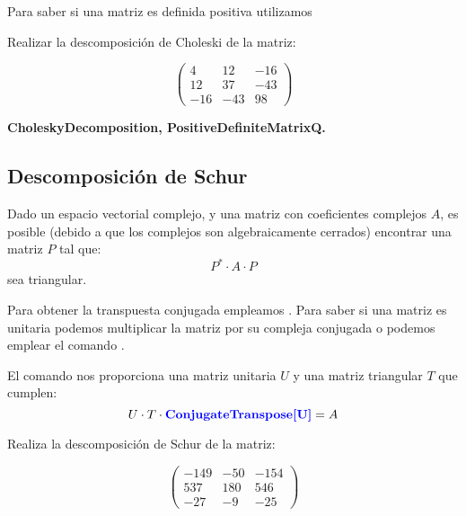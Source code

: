 \documentclass[a4paper,10pt, draft]{article}
\newcommand{\com}[1]{\textbf{\color{blue}{#1}}}
\newenvironment{ejer}{\begin{tcolorbox}[center title, title=Ejercicios,
fonttitle=\sffamily\bfseries,colback=blue!5,colframe=orange]}{\end{tcolorbox}}
\newenvironment{funciones}{\begin{tcolorbox}[center title, title=Nuevas funciones, fonttitle=\sffamily\bfseries, colback=green!5!white,colframe=red!75!black]}{\end{tcolorbox}\bigskip}
\begin{document}
 Para saber si una matriz es definida positiva utilizamos \com{PositiveDefiniteMatrixQ[M]}

\begin{ejer}

Realizar la descomposición de Choleski de la matriz:

$$
\begin{pmatrix}
4 & 12 &-16\\
12& 37&-43\\
-16&-43&98
\end{pmatrix}
$$

\end{ejer} 

\begin{funciones}

\textbf{CholeskyDecomposition, PositiveDefiniteMatrixQ.}

\end{funciones}




 \newpage


\subsection{Descomposición de Schur}


Dado un espacio vectorial complejo, y una matriz con coeficientes complejos $A$, es posible (debido a que  los complejos  son algebraicamente cerrados) encontrar una matriz $P$ tal que:
$$
P^*\cdot A\cdot P
$$
sea triangular.



Para obtener la transpuesta conjugada empleamos \com{ConjugateTranspose[M]}. Para saber si una matriz es unitaria podemos multiplicar la matriz por su compleja conjugada o podemos emplear el comando \com{UnitaryMatrixQ[M]}.

 El comando \com{SchurDecomposition[M]} nos proporciona  una matriz  unitaria $U$ y  una matriz triangular $T$ que cumplen:
$$
U\cdot T\cdot \mathrm{\com{ConjugateTranspose[U]} }= A
$$

\begin{ejer}

Realiza la descomposición de Schur de la matriz:

$$
\begin{pmatrix}
-149& -50 &-154\\
537& 180&546\\
-27&-9&-25
\end{pmatrix}
$$


\end{ejer}
\end{document}
